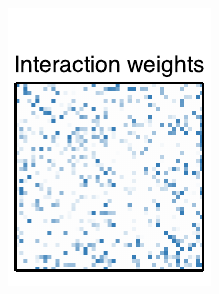 \documentclass[aos,noinfoline]{imsart} %
\begin{document}
\begin{figure}[t!]
\begin{subfigure}[T]{1.2in}
    \includegraphics[width=\textwidth]{network2}
  \end{subfigure}
  ~
  \begin{subfigure}[T]{1.2in}

\end{subfigure}
\end{figure}
\end{document}
